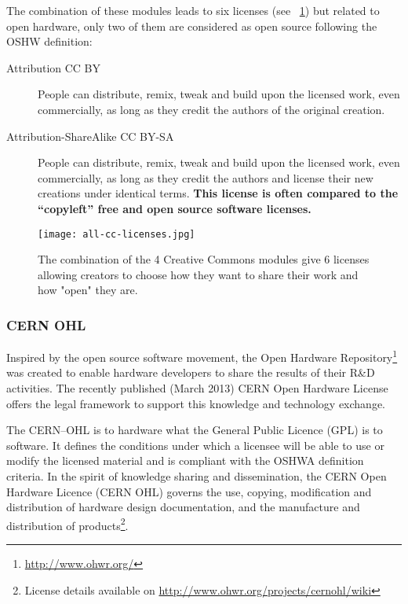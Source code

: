 The combination of these modules leads to six licenses (see \figurename~\ref{fig:all-cc-licenses}) but related to open hardware, only two of them are considered as open source following the OSHW definition:
\begin{description}
    \item[Attribution CC BY] People can distribute, remix, tweak and build upon the licensed work, even commercially, as long as they credit the authors of the original creation.
    \item[Attribution-ShareAlike CC BY-SA] People can distribute, remix, tweak and build upon the licensed work, even commercially, as long as they credit the authors and license their new creations under identical terms. \textbf{This license is often compared to the “copyleft” free and open source software licenses.}
\end{description}

\begin{figure}[tb]
    \begin{center}
        \texttt{[image: all-cc-licenses.jpg]}
    \end{center}
    \caption{The combination of the 4 Creative Commons modules give 6 licenses allowing creators to choose how they want to share their work and how "open" they are.}
    \label{fig:all-cc-licenses}
\end{figure}

\subsubsection{CERN OHL} %

Inspired by the open source software movement, the Open Hardware Repository\footnote{\url{http://www.ohwr.org/}} was created to enable hardware developers to share the results of their R\&D activities. The recently published (March 2013) CERN Open Hardware License offers the legal framework to support this knowledge and technology exchange.

The CERN–OHL is to hardware what the General Public Licence (GPL) is to software. It defines the conditions under which a licensee will be able to use or modify the licensed material and is compliant with the OSHWA definition criteria. In the spirit of knowledge sharing and dissemination, the CERN Open Hardware Licence (CERN OHL) governs the use, copying, modification and distribution of hardware design documentation, and the manufacture and distribution of products\footnote{License details available on \url{http://www.ohwr.org/projects/cernohl/wiki}}.



